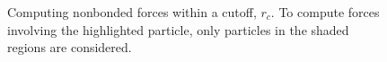 \begin{figure}[htbp]
\begin{center}
 \qquad
{}
\caption{Computing nonbonded forces within a cutoff, $r_c$.  To compute 
forces involving the highlighted particle, only particles in the shaded
regions are considered.}
\label{fig:nb}
\end{center}
\end{figure}

